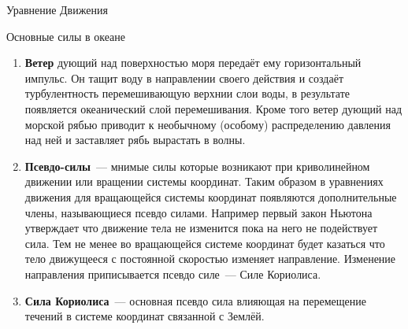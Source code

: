 \begin{chapter}{Уравнение Движения}
\begin{section}{Основные силы в океане}
\begin{enumerate}
\item
\textbf{Ветер} дующий над поверхностью моря передаёт ему
горизонтальный импульс. Он тащит воду в направлении своего действия и
создаёт турбулентность перемешивающую верхнии слои воды, в результате
появляется океанический слой перемешивания. Кроме того ветер дующий
над морской рябью приводит к необычному (особому) распределению
давления над ней и заставляет рябь вырастать в волны.
%

\item
\textbf{Псевдо-силы}~--- мнимые силы которые возникают при
криволинейном движении или вращении системы координат. Таким образом в
уравнениях движения для вращающейся системы координат появляются
дополнительные члены, называющиеся псевдо силами. Например первый
закон Ньютона утверждает что движение тела не изменится пока на него
не подействует сила. Тем не менее во вращающейся системе координат
будет казаться что тело движущееся с постоянной скоростью изменяет
направление. Изменение направления приписывается псевдо силе~--- Силе
Кориолиса.
%

\item
\textbf{Сила Кориолиса}~--- основная псевдо сила влияющая на
перемещение течений в системе координат связанной с Землёй.
%
\end{enumerate}


\end{section}
\end{chapter}
